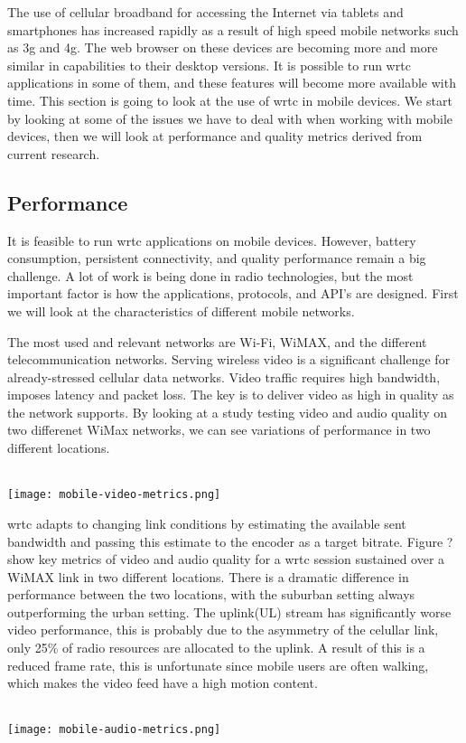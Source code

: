 The use of cellular broadband for accessing the Internet via tablets and smartphones has increased rapidly as a result of high speed mobile networks such as 3g and 4g. The web browser on these devices are becoming more and more similar in capabilities to their desktop versions. It is possible to run \gls{wrtc} applications in some of them, and these features will become more available with time. This section is going to look at the use of \gls{wrtc} in mobile devices. We start by looking at some of the issues we have to deal with when working with mobile devices, then we will look at performance and quality metrics derived from current research.

\subsection{Performance}
It is feasible to run \gls{wrtc} applications on mobile devices. However, battery consumption,  persistent connectivity, and quality performance remain a big challenge. A lot of work is being done in radio technologies, but the most important factor is how the applications, protocols, and API's are designed\cite{}. First we will look at the characteristics of different mobile networks.

The most used and relevant networks are Wi-Fi, WiMAX, and the different telecommunication networks. Serving wireless video is a significant challenge for already-stressed cellular data networks\cite{erman2011over}. Video traffic requires high bandwidth, imposes latency and packet loss. The key is to deliver video as high in quality as the network supports. By looking at a study testing video and audio quality on two differenet WiMax networks\cite{fund2013performance}, we can see variations of performance in two different locations.
\\
\\
\centerline{\texttt{[image: mobile-video-metrics.png]}}

\gls{wrtc} adapts to changing link conditions by estimating the available sent bandwidth and passing this estimate to the encoder as a target bitrate. Figure ? show key metrics of video and audio quality for a \gls{wrtc} session sustained over a WiMAX link in two different locations. There is a dramatic difference in performance between the two locations, with the suburban setting always outperforming the urban setting. The uplink(UL) stream has significantly worse video performance, this is probably due to the asymmetry of the celullar link, only 25\% of radio resources are allocated to the uplink. A result of this is a reduced frame rate, this is unfortunate since mobile users are often walking, which makes the video feed have a high motion content.
\\
\\
\centerline{\texttt{[image: mobile-audio-metrics.png]}}

